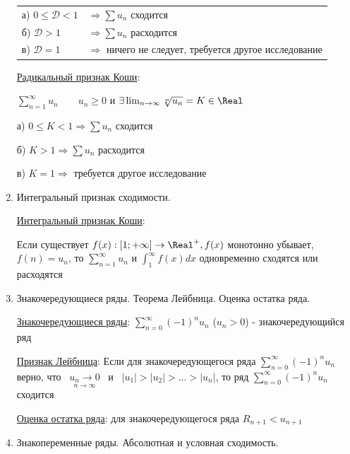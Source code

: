 \documentclass[12pt]{article}
\begin{document}
\begin{enumerate}
    \begin{tabular}{ll}
        а) $0 \leq \mathcal{D} < 1$ & $\Longrightarrow \sum u_n$ сходится                                \\

        б) $\mathcal{D} > 1$        & $\Longrightarrow \sum u_n$ расходится                              \\

        в) $\mathcal{D} = 1$        & $\Longrightarrow$ ничего не следует, требуется другое исследование \\
    \end{tabular}

    \hyperlink{cauchyradicalsign}{Радикальный признак Коши}:

    $\sum_{n = 1}^\infty u_n \quad\quad u_n \geq 0$ и $\exists \lim_{n \to \infty} \sqrt[n]{u_n} = K \in \Real$

    а) $0 \leq K < 1 \Longrightarrow \sum u_n$ сходится

    б) $K > 1 \Longrightarrow \sum u_n$ расходится

    в) $K = 1 \Longrightarrow$ требуется другое исследование

    \item Интегральный признак сходимости.

    \hyperlink{cauchyintegralsign}{Интегральный признак Коши}:

    Если существует $f(x) : [1; +\infty] \to \Real^+, f(x)$ монотонно убывает, $f(n) = u_n$, то $\sum_{n = 1}^\infty u_n$ и $\int_{1}^\infty f(x) dx$ одновременно сходятся или расходятся

    \item Знакочередующиеся ряды. Теорема Лейбница. Оценка остатка ряда.

    \hyperlink{alternatingsignseries}{Знакочередующиеся ряды}: $\sum_{n = 0}^\infty (-1)^n u_n$ ($u_n > 0$) - знакочередующийся ряд

    \hyperlink{leibniztheorem}{Признак Лейбница}: Если для знакочередующегося ряда $\sum_{n = 0}^\infty (-1)^n u_n$ верно,
    что \ $\underset{n \to \infty}{u_n \to 0}$ \ и \ $|u_1| > |u_2| > \dots > |u_n|$,
    то ряд $\sum_{n = 0}^\infty (-1)^n u_n$ сходится

    \hyperlink{seriesremainderevaluation}{Оценка остатка ряда}: для знакочередующегося ряда $R_{n + 1} < u_{n + 1}$

    \item Знакопеременные ряды. Абсолютная и условная сходимость.


\end{enumerate}
\end{document}
